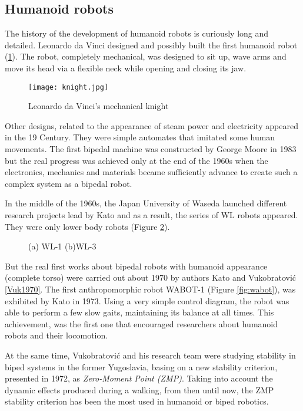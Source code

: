 \subsection{Humanoid robots}

The history of the development of humanoid robots is curiously long and detailed. Leonardo da Vinci designed and possibly built the first humanoid robot (\ref{fig:knight}). The robot, completely mechanical, was designed to sit up, wave arms and move its head via a flexible neck while opening and closing its jaw. 

\begin{figure}[!hbt]
\centering
\texttt{[image: knight.jpg]}
\caption{Leonardo da Vinci's mechanical knight}
\label{fig:knight}
\end{figure}

Other designs, related to the appearance of steam power and electricity appeared in the 19 Century. They were simple automates that imitated some human movements. The first bipedal machine was constructed by George Moore in 1983 but the real progress was achieved only at the end of the 1960s when the electronics, mechanics and materials became sufficiently advance to create such a complex system as a bipedal robot.

In the middle of the 1960s, the Japan University of Waseda launched different research projects lead by Kato and as a result, the series of WL robots appeared. They were only lower body robots (Figure \ref{fig:wl}).

\begin{figure}[!hbt]
\centering 
{}\hspace{10mm}
\caption{(a) WL-1 (b)WL-3}
\label{fig:wl}
\end{figure}

But the real first works about bipedal robots with humanoid appearance (complete torso) were carried out about 1970 by authors Kato \cite{Kaj2005} and Vukobratović \ref{Vuk1970}. The first anthropomorphic robot WABOT-1 (Figure \ref{fig:wabot}), was exhibited by Kato in 1973. Using a very simple control diagram, the robot was able to perform a few slow gaits, maintaining its balance at all times. This achievement, was the first one that encouraged researchers about humanoid robots and their locomotion.

At the same time, Vukobratović and his research team were studying stability in biped systems in the former Yugoslavia, basing on a new stability criterion, presented in 1972, as \textit{Zero-Moment Point (ZMP)}. Taking into account the dynamic effects produced during a walking, from then until now, the ZMP stability criterion has been the most used in humanoid or biped robotics.

